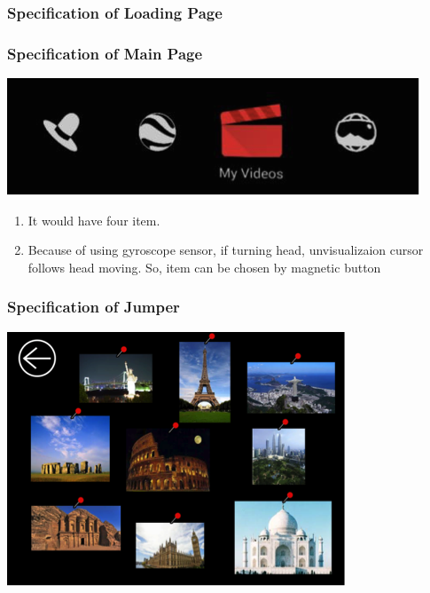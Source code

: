 \documentclass[12pt]{article}
\begin{document}
\subsubsection{Specification of Loading Page}

\newpage
\subsubsection{Specification of Main Page}
\includegraphics{Main}
\begin{enumerate}
\item It would have four item.
\item Because of using gyroscope sensor, if turning head, unvisualizaion cursor follows head moving. So, item can be chosen by magnetic button
\end{enumerate}

\subsubsection{Specification of Jumper}
\includegraphics{Jumper}
\end{document}
